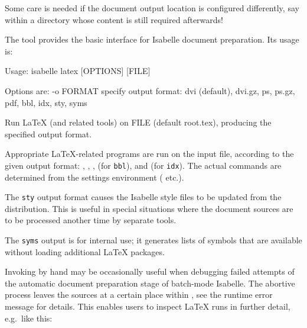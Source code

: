 \begin{isabellebody}
\begin{isamarkuptext}
  Some care is needed if the document output location is configured
  differently, say within a directory whose content is still required
  afterwards!%
\end{isamarkuptext}%
\isamarkuptrue%
%
\isamarkuptrue%
%
\begin{isamarkuptext}%
The \hypertarget{tool.latex}{\hyperlink{tool.latex}{\mbox{}}} tool provides the basic interface for
  Isabelle document preparation.  Its usage is:
\begin{ttbox}
Usage: isabelle latex [OPTIONS] [FILE]

  Options are:
    -o FORMAT    specify output format: dvi (default), dvi.gz, ps,
                 ps.gz, pdf, bbl, idx, sty, syms

  Run LaTeX (and related tools) on FILE (default root.tex),
  producing the specified output format.
\end{ttbox}

  Appropriate {\LaTeX}-related programs are run on the input file,
  according to the given output format: \hyperlink{executable.latex}{\mbox{}},
  \hyperlink{executable.pdflatex}{\mbox{}}, \hyperlink{executable.dvips}{\mbox{}}, \hyperlink{executable.bibtex}{\mbox{}}
  (for \verb|bbl|), and \hyperlink{executable.makeindex}{\mbox{}} (for \verb|idx|).  The actual commands are determined from the settings
  environment (\hyperlink{setting.ISABELLE-LATEX}{\mbox{}} etc.).

  The \verb|sty| output format causes the Isabelle style files to
  be updated from the distribution.  This is useful in special
  situations where the document sources are to be processed another
  time by separate tools.

  The \verb|syms| output is for internal use; it generates lists
  of symbols that are available without loading additional {\LaTeX}
  packages.%
\end{isamarkuptext}%
\isamarkuptrue%
%
\isamarkuptrue%
%
\begin{isamarkuptext}%
Invoking \hyperlink{tool.latex}{\mbox{}} by hand may be occasionally useful when
  debugging failed attempts of the automatic document preparation
  stage of batch-mode Isabelle.  The abortive process leaves the
  sources at a certain place within \hyperlink{setting.ISABELLE-BROWSER-INFO}{\mbox{}},
  see the runtime error message for details.  This enables users to
  inspect {\LaTeX} runs in further detail, e.g.\ like this:


\end{isamarkuptext}
\end{isabellebody}
